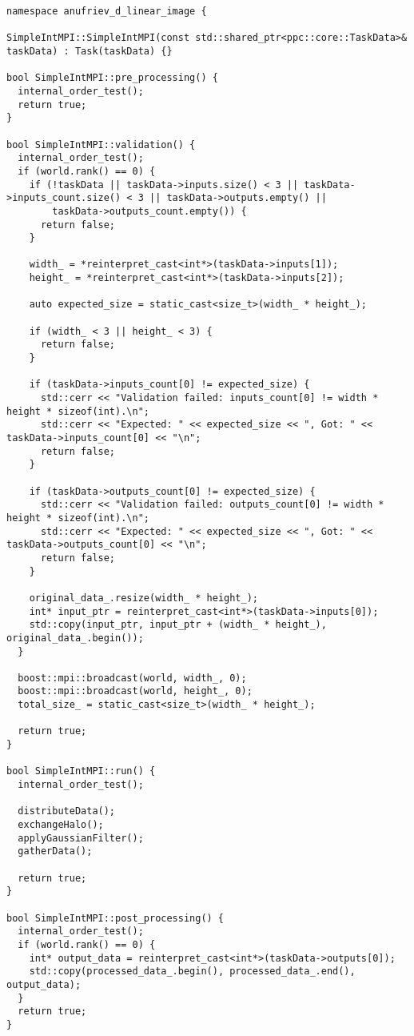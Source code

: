 \documentclass[12pt]{article}
\begin{document}
\begin{lstlisting}
namespace anufriev_d_linear_image {

SimpleIntMPI::SimpleIntMPI(const std::shared_ptr<ppc::core::TaskData>& taskData) : Task(taskData) {}

bool SimpleIntMPI::pre_processing() {
  internal_order_test();
  return true;
}

bool SimpleIntMPI::validation() {
  internal_order_test();
  if (world.rank() == 0) {
    if (!taskData || taskData->inputs.size() < 3 || taskData->inputs_count.size() < 3 || taskData->outputs.empty() ||
        taskData->outputs_count.empty()) {
      return false;
    }

    width_ = *reinterpret_cast<int*>(taskData->inputs[1]);
    height_ = *reinterpret_cast<int*>(taskData->inputs[2]);

    auto expected_size = static_cast<size_t>(width_ * height_);

    if (width_ < 3 || height_ < 3) {
      return false;
    }

    if (taskData->inputs_count[0] != expected_size) {
      std::cerr << "Validation failed: inputs_count[0] != width * height * sizeof(int).\n";
      std::cerr << "Expected: " << expected_size << ", Got: " << taskData->inputs_count[0] << "\n";
      return false;
    }

    if (taskData->outputs_count[0] != expected_size) {
      std::cerr << "Validation failed: outputs_count[0] != width * height * sizeof(int).\n";
      std::cerr << "Expected: " << expected_size << ", Got: " << taskData->outputs_count[0] << "\n";
      return false;
    }

    original_data_.resize(width_ * height_);
    int* input_ptr = reinterpret_cast<int*>(taskData->inputs[0]);
    std::copy(input_ptr, input_ptr + (width_ * height_), original_data_.begin());
  }

  boost::mpi::broadcast(world, width_, 0);
  boost::mpi::broadcast(world, height_, 0);
  total_size_ = static_cast<size_t>(width_ * height_);

  return true;
}

bool SimpleIntMPI::run() {
  internal_order_test();

  distributeData();
  exchangeHalo();
  applyGaussianFilter();
  gatherData();

  return true;
}

bool SimpleIntMPI::post_processing() {
  internal_order_test();
  if (world.rank() == 0) {
    int* output_data = reinterpret_cast<int*>(taskData->outputs[0]);
    std::copy(processed_data_.begin(), processed_data_.end(), output_data);
  }
  return true;
}


\end{lstlisting}
\end{document}
